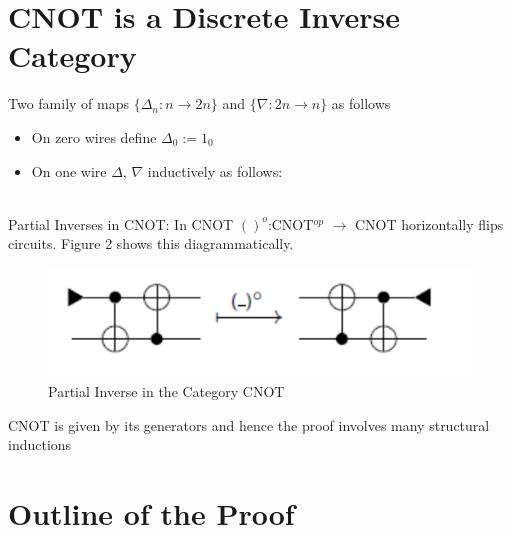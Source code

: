 \documentclass[11pt, oneside]{amsart}
\theoremstyle{definition}
\theoremstyle{definition}
\begin{document}
\section{CNOT is a Discrete Inverse Category}
Two family of maps $\{\Delta_{n}:n\to 2n\}$ and $\{\nabla:2n \to n\}$ as follows 
\begin{itemize}
    \item On zero wires define $\Delta_{0}:=1_{0}$
    \item On one wire $\Delta$, $\nabla$ inductively as follows:
\end{itemize}
\\
Partial Inverses in CNOT: In CNOT $()^{o}$:CNOT$^{op}$ $\to$ CNOT horizontally flips circuits. Figure 2 shows this diagrammatically.\\
\begin{figure}
\includegraphics{CNOT.pdf}
\centering
\caption{Partial Inverse in the Category CNOT}
\end{figure}
CNOT is given by its generators and hence the proof involves many structural inductions


\section{Outline of the Proof}
\end{document}
